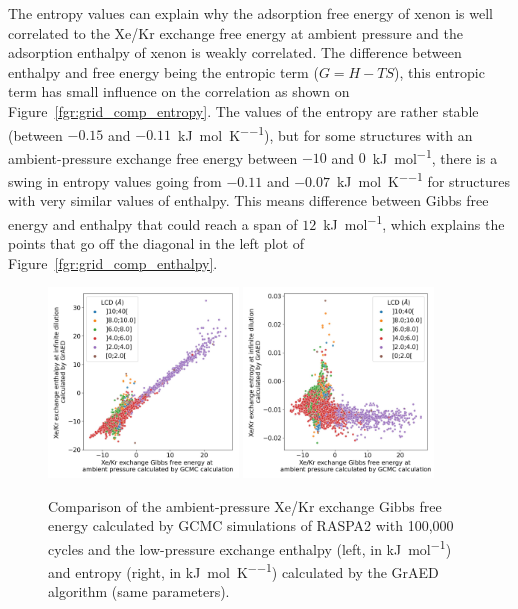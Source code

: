 \documentclass[main]{subfiles}
\begin{document}
The entropy values can explain why the adsorption free energy of xenon is well correlated to the Xe/Kr exchange free energy at ambient pressure and the adsorption enthalpy of xenon is weakly correlated. The difference between enthalpy and free energy being the entropic term ($G=H-TS$), this entropic term has small influence on the correlation as shown on Figure~\ref{fgr:grid_comp_entropy}. The values of the entropy are rather stable (between $-0.15$ and $-0.11$~\si{\kilo\joule\per\mole\per\kelvin}), but for some structures with an ambient-pressure exchange free energy between $-10$ and $0$~\si{\kilo\joule\per\mole}, there is a swing in entropy values going from $-0.11$ and $-0.07$~\si{\kilo\joule\per\mole\per\kelvin} for structures with very similar values of enthalpy. This means difference between Gibbs free energy and enthalpy that could reach a span of $12$~\si{\kilo\joule\per\mole}, which explains the points that go off the diagonal in the left plot of Figure~\ref{fgr:grid_comp_enthalpy}.

\begin{figure}[ht]
  \centering
    \includegraphics[width=0.45\textwidth]{figures/3-fastsim/G_2080_vs_H_grid_overview.jpg}
    \includegraphics[width=0.45\textwidth]{figures/3-fastsim/G_2080_vs_S_grid_overview.jpg}
    \caption{Comparison of the ambient-pressure Xe/Kr exchange Gibbs free energy calculated by GCMC simulations of RASPA2 with 100,000 cycles and the low-pressure exchange enthalpy (left, in \si{\kilo\joule\per\mole}) and entropy (right, in \si{\kilo\joule\per\mole\per\kelvin}) calculated by the GrAED algorithm (same parameters).}\label{fgr:grid_comp_exc}
\end{figure}
\end{document}
